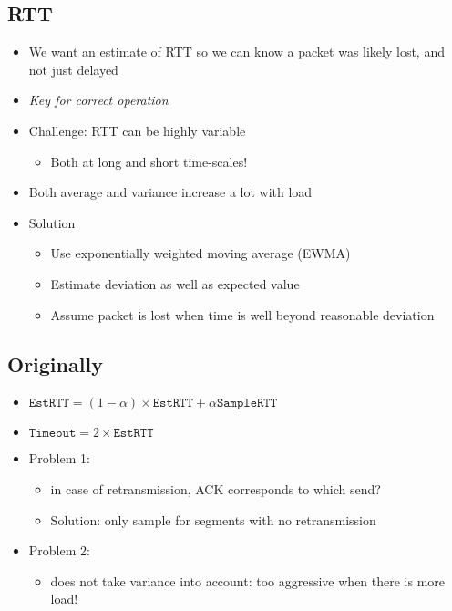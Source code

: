 \subsection{RTT}
\begin{itemize}[nosep]
    \item We want an estimate of RTT so we can know a packet was likely lost, and not just delayed
    \item \emph{Key for correct operation}
    \item Challenge: RTT can be highly variable
          \begin{itemize}[nosep]
              \item Both at long and short time-scales!
          \end{itemize}
    \item Both average and variance increase a lot with load
    \item Solution
          \begin{itemize}[nosep]
              \item Use exponentially weighted moving average (EWMA)
              \item Estimate deviation as well as expected value
              \item Assume packet is lost when time is well beyond reasonable deviation
          \end{itemize}
\end{itemize}

\subsection{Originally}
\begin{itemize}[nosep]
    \item $\texttt{EstRTT} = (1 - \alpha) \times \texttt{EstRTT} + \alpha\texttt{SampleRTT}$
    \item $\texttt{Timeout} = 2 \times \texttt{EstRTT}$
    \item Problem 1:
          \begin{itemize}[nosep]
              \item in case of retransmission, ACK corresponds to which send?
              \item Solution: only sample for segments with no retransmission
          \end{itemize}
    \item Problem 2:
          \begin{itemize}[nosep]
              \item does not take variance into account: too aggressive when there is more load!
          \end{itemize}
\end{itemize}
